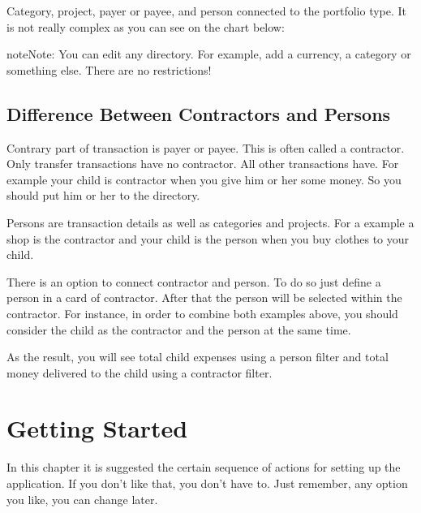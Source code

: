 \documentclass[a4paper,10pt,english]{sphinxmanual}
\begin{document}
\sphinxAtStartPar
Category, project, payer or payee, and person connected to the portfolio type. It is not really
complex as you can see on the chart below:


\begin{sphinxadmonition}{note}{Note:}
\sphinxAtStartPar
You can edit any directory. For example, add a currency, a category or something else. There are no restrictions!
\end{sphinxadmonition}


\section{Difference Between Contractors and Persons}
\label{\detokenize{intro:difference-between-contractors-and-persons}}
\sphinxAtStartPar
Contrary part of transaction is payer or payee. This is often called a contractor. Only transfer transactions
have no contractor. All other transactions have. For example your child is contractor
when you give him or her some money. So you should put him or her to the  directory.

\sphinxAtStartPar
Persons are transaction details as well as categories and projects. For a example a shop is the contractor
and your child is the person when you buy clothes to your child.

\sphinxAtStartPar
There is an option to connect contractor and person. To do so just define a person in a card
of contractor. After that the person will be selected within the contractor. For instance, in order
to combine both examples above, you should consider the child as the contractor and the person at the same time.

\sphinxAtStartPar
As the result, you will see total child expenses using a person filter and total
money delivered to the child using a contractor filter.

\sphinxstepscope


\chapter{Getting Started}
\label{\detokenize{getting-started:getting-started}}\label{\detokenize{getting-started::doc}}
\sphinxAtStartPar
In this chapter it is suggested the certain sequence of actions for setting up the application.
If you don’t like that, you don’t have to.  Just remember, any option you like, you can change later.
\end{document}
